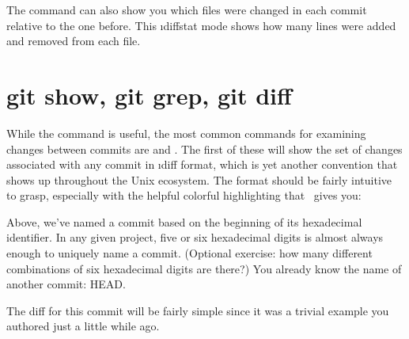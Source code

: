 \documentclass[letterpaper, 12pt, titlepage, twoside]{article}
\begin{document}


The \x {} command can also show you which files were changed in each
commit relative to the one before. This \i{diffstat} mode shows how many lines
were added and removed from each file.




\section{git show, git grep, git diff}

While the  command is useful, the most common commands for
examining changes between commits are  and . The first of
these will show the set of changes associated with any commit in \i{diff
  format}, which is yet another convention that shows up throughout the Unix
ecosystem. The format should be fairly intuitive to grasp, especially with the
helpful colorful highlighting that \git\ gives you:


Above, we've named a commit based on the beginning of its hexadecimal
identifier. In any given project, five or six hexadecimal digits is almost
always enough to uniquely name a commit. (Optional exercise: how many
different combinations of six hexadecimal digits are there?) You already know
the name of another commit: HEAD.


The diff for this commit will be fairly simple since it was a trivial example
you authored just a little while ago.

\end{document}
